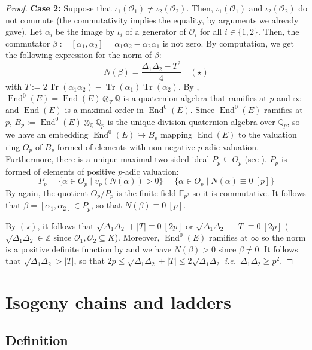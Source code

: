 \documentclass[a4paper,10pt]{report}
\theoremstyle{definition}
\theoremstyle{plain}
\theoremstyle{definition}
\newcommand{\ie}{\emph{i.e.}\ }
\newcommand{\Z}{\mathbb{Z}}
\newcommand{\Q}{\mathbb{Q}}
\newcommand{\F}{\mathbb{F}}
\newcommand{\mO}{\mathcal{O}}
\renewcommand{\(}{\left(}
\renewcommand{\)}{\right)}
\DeclareMathOperator{\End}{End}
\DeclareMathOperator{\Tr}{Tr}
\begin{document}
\begin{proof}
\textbf{Case 2:} Suppose that $\iota_1(\mO_1)\neq\iota_2(\mO_2)$. Then, $\iota_1(\mO_1)$ and $\iota_2(\mO_2)$ do not commute (the commutativity implies the equality, by arguments we already gave).  Let $\alpha_i$ be the image by $\iota_i$ of a generator of $\mO_i$ for all $i\in\{1,2\}$. Then, the commutator $\beta:=[\alpha_1,\alpha_2]=\alpha_1\alpha_2-\alpha_2\alpha_1$ is not zero.  By computation, we get the following expression for the norm of $\beta$:
\[N(\beta)=\frac{\Delta_1\Delta_2-T^2}{4}\quad (\star)\]
with $T:=2\Tr(\alpha_1\alpha_2)-\Tr(\alpha_1)\Tr(\alpha_2)$. By \cite[theorem 42.1.19]{Voight}, $\End^0(E)=\End(E)\otimes_\Z \Q$ is a quaternion algebra that ramifies at $p$ and $\infty$ and $\End(E)$ is a maximal order in $\End^0(E)$. Since $\End^0(E)$ ramifies at $p$, $B_p:=\End^0(E)\otimes_\Q\Q_p$ is the unique division quaternion algebra over $\Q_p$, so we have an embedding $\End^0(E)\hookrightarrow B_p$ mapping $\End(E)$ to the valuation ring $O_p$ of $B_p$ formed of elements with non-negative $p$-adic valuation.  Furthermore, there is a unique maximal two sided ideal $P_p\subseteq O_p$ (see \cite[theorem 13.3.11]{Voight}). $P_p$ is formed of elements of positive $p$-adic valuation:
\[P_p=\{\alpha\in O_p\mid v_p(N(\alpha))>0\}=\{\alpha\in O_p\mid N(\alpha)\equiv 0 \ [p]\}\]
By \cite[theorem 13.3.11.(b)]{Voight} again, the quotient $O_p/P_p$ is the finite field $\F_{p^2}$ so it is commutative. It follows that $\beta=[\alpha_1,\alpha_2]\in P_p$, so that $N(\beta)\equiv 0 \ [p]$. 

By $(\star)$, it follows that $\sqrt{\Delta_1\Delta_2}+|T|\equiv 0 \ [2p]$ or $\sqrt{\Delta_1\Delta_2}-|T|\equiv 0 \ [2p]$ ($\sqrt{\Delta_1\Delta_2}\in\Z$ since $\mO_1,\mO_2\subseteq K$). Moreover, $\End^0(E)$ ramifies at $\infty$ so the norm is a positive definite function by \cite[Exercise 2.4]{Voight} and we have $N(\beta)>0$ since $\beta\neq 0$. It follows that $\sqrt{\Delta_1\Delta_2}>|T|$, so that $2p\leq\sqrt{\Delta_1\Delta_2}+|T|\leq 2\sqrt{\Delta_1\Delta_2}$ \ie  $\Delta_1\Delta_2\geq p^2$.
\end{proof}

\section{Isogeny chains and ladders}

\subsection{Definition}
\end{document}
